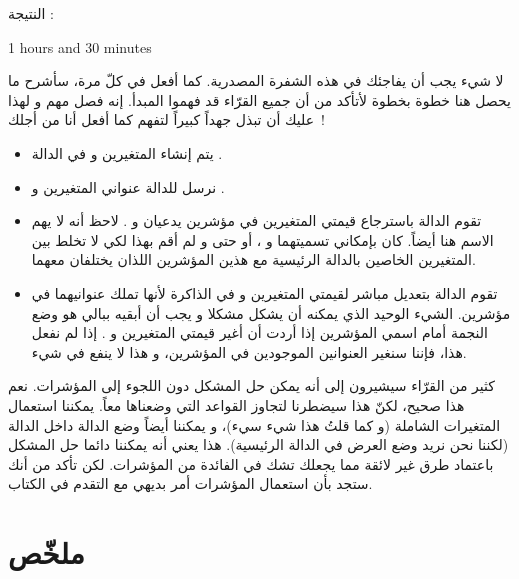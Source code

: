 النتيجة :

\begin{Console}
1 hours and 30 minutes
\end{Console}

لا شيء يجب أن يفاجئك في هذه الشفرة المصدرية. كما أفعل في كلّ مرة، سأشرح ما يحصل هنا خطوة بخطوة لأتأكد من أن جميع القرّاء قد فهموا المبدأ. إنه فصل مهم و لهذا عليك أن تبذل جهداً كبيراً لتفهم كما أفعل أنا من أجلك~!

\begin{itemize}
	\item يتم إنشاء المتغيرين
و
في الدالة
.
	\item نرسل للدالة
عنواني المتغيرين
و
.
	\item تقوم الدالة
باسترجاع قيمتي المتغيرين في مؤشرين يدعيان
و
.
لاحظ أنه لا يهم الاسم هنا أيضاً. كان بإمكاني تسميتهما
و
،
أو حتى
و
لم أقم بهذا لكي لا تخلط بين المتغيرين الخاصين بالدالة الرئيسية مع هذين المؤشرين اللذان يختلفان معهما.
	\item تقوم الدالة
بتعديل مباشر لقيمتي المتغيرين
و
في الذاكرة لأنها تملك عنوانيهما في مؤشرين. الشيء الوحيد الذي يمكنه أن يشكل مشكلا و يجب أن أبقيه ببالي هو وضع النجمة أمام اسمي المؤشرين إذا أردت أن أغير قيمتي المتغيرين
و
.
إذا لم نفعل هذا، فإننا سنغير العنوانين الموجودين في المؤشرين، و هذا لا ينفع في شيء.
\end{itemize}

\begin{information}
	كثير من القرّاء سيشيرون إلى أنه يمكن حل المشكل دون اللجوء إلى المؤشرات. نعم هذا صحيح، لكنّ هذا سيضطرنا لتجاوز القواعد التي وضعناها معاً. يمكننا استعمال المتغيرات الشاملة (و كما قلتُ هذا شيء سيء)، و يمكننا أيضاً وضع الدالة
داخل الدالة
(لكننا نحن نريد وضع العرض في الدالة الرئيسية). هذا يعني أنه يمكننا دائما حل المشكل باعتماد طرق غير لائقة مما يجعلك تشك في الفائدة من المؤشرات. لكن تأكد من أنك ستجد بأن استعمال المؤشرات أمر بديهي مع التقدم في الكتاب.
\end{information}

\section*{ملخّص}

